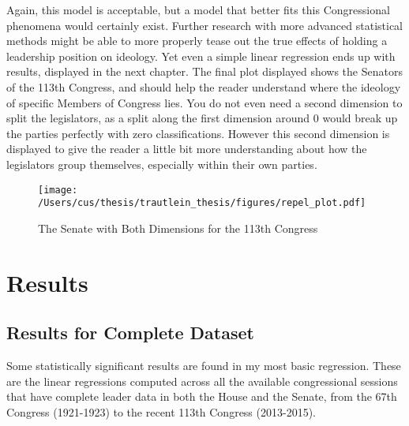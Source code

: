 \documentclass[12pt,twoside]{reedthesis}
\begin{document}
  Again, this model is acceptable, but a model that better fits this
  Congressional phenomena would certainly exist. Further research with
  more advanced statistical methods might be able to more properly tease
  out the true effects of holding a leadership position on ideology. Yet
  even a simple linear regression ends up with results, displayed in the
  next chapter. The final plot displayed shows the Senators of the 113th
  Congress, and should help the reader understand where the ideology of
  specific Members of Congress lies. You do not even need a second
  dimension to split the legislators, as a split along the first dimension
  around 0 would break up the parties perfectly with zero classifications.
  However this second dimension is displayed to give the reader a little
  bit more understanding about how the legislators group themselves,
  especially within their own parties.
  
  \begin{figure}[h!tbp]
  \centering
  \texttt{[image: /Users/cus/thesis/trautlein\_thesis/figures/repel\_plot.pdf]}
  \caption[The Senate with Both Dimensions for the 113th Congress]{\normalsize{The Senate with Both Dimensions for the 113th Congress}}
  \label{fig:def}
  \end{figure}
  
  \chapter{Results}\label{results}
  
  \section{Results for Complete
  Dataset}\label{results-for-complete-dataset}
  
  Some statistically significant results are found in my most basic
  regression. These are the linear regressions computed across all the
  available congressional sessions that have complete leader data in both
  the House and the Senate, from the 67th Congress (1921-1923) to the
  recent 113th Congress (2013-2015).
  
\end{document}
